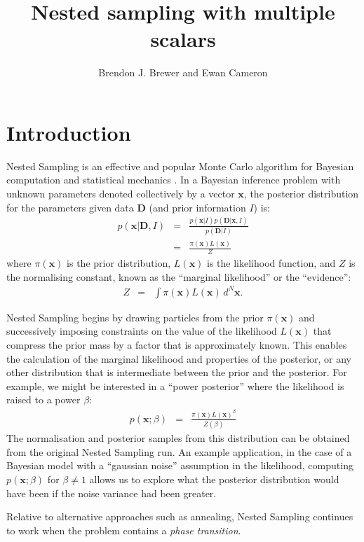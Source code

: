 \documentclass[a4paper, 11pt]{article}
\title{Nested sampling with multiple scalars}
\author{Brendon J. Brewer and Ewan Cameron}
\newcommand{\xx}{\mathbf{x}}	%
\newcommand{\data}{\mathbf{D}}  %
\newcommand{\dx}{d^N\mathbf{x}} %
\begin{document}
\maketitle


\section{Introduction}
Nested Sampling \citep{skilling} is an effective and popular
Monte Carlo algorithm for Bayesian computation and
statistical mechanics
\citep{2009arXiv0906.3544P, 2014PhRvE..89b2302P, 2015arXiv150303404B}.
In a Bayesian inference problem with unknown parameters denoted collectively
by a vector $\xx$, the
posterior distribution for the parameters given data $\data$ (and prior
information $I$) is:
\begin{eqnarray}
p(\xx | \data, I) &=&
\frac{p(\xx | I)p(\data | \xx, I)}{p(\data | I)}\\
&=& \frac{\pi(\xx)L(\xx)}{Z}
\end{eqnarray}
where $\pi(\xx)$ is the prior distribution, $L(\xx)$ is the likelihood
function, and $Z$ is the normalising constant, known as the
``marginal likelihood'' or the ``evidence'':
\begin{eqnarray}
Z &=& \int \pi(\xx) L(\xx) \, \dx.
\end{eqnarray}

Nested Sampling begins by drawing particles from the
prior $\pi(\xx)$ and successively imposing constraints on the value of
the likelihood $L(\xx)$ that compress the prior mass by a
factor that is approximately known.
This enables the calculation of the marginal likelihood
and properties of the posterior, or any other distribution that is intermediate
between the prior and the posterior. For example, we might be interested in
a ``power posterior'' where the likelihood is raised to a power $\beta$:
\begin{eqnarray}
p(\xx; \beta) &=& \frac{\pi(\xx)L(\xx)^\beta}{Z(\beta)}
\end{eqnarray}
The normalisation and posterior samples from this distribution can be obtained
from the original Nested Sampling run. An example application, in the case of
a Bayesian model with a ``gaussian noise'' assumption in the likelihood,
computing $p(\xx; \beta)$ for $\beta \neq 1$ allows us to explore what the
posterior distribution would have been if the noise variance had been greater.

Relative to alternative approaches such as annealing, Nested Sampling continues
to work when the problem contains a {\it phase transition}.
\end{document}

